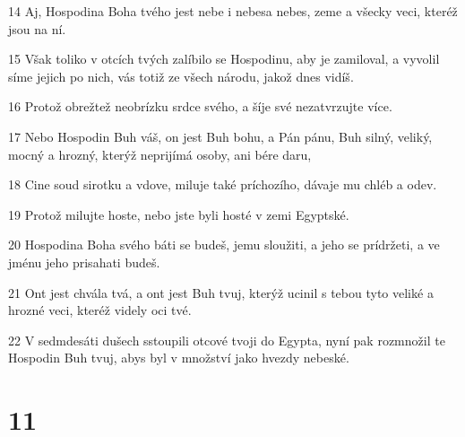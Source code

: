 \par 14 Aj, Hospodina Boha tvého jest nebe i nebesa nebes, zeme a všecky veci, kteréž jsou na ní.
\par 15 Však toliko v otcích tvých zalíbilo se Hospodinu, aby je zamiloval, a vyvolil síme jejich po nich, vás totiž ze všech národu, jakož dnes vidíš.
\par 16 Protož obrežtež neobrízku srdce svého, a šíje své nezatvrzujte více.
\par 17 Nebo Hospodin Buh váš, on jest Buh bohu, a Pán pánu, Buh silný, veliký, mocný a hrozný, kterýž neprijímá osoby, ani bére daru,
\par 18 Cine soud sirotku a vdove, miluje také príchozího, dávaje mu chléb a odev.
\par 19 Protož milujte hoste, nebo jste byli hosté v zemi Egyptské.
\par 20 Hospodina Boha svého báti se budeš, jemu sloužiti, a jeho se prídržeti, a ve jménu jeho prisahati budeš.
\par 21 Ont jest chvála tvá, a ont jest Buh tvuj, kterýž ucinil s tebou tyto veliké a hrozné veci, kteréž videly oci tvé.
\par 22 V sedmdesáti dušech sstoupili otcové tvoji do Egypta, nyní pak rozmnožil te Hospodin Buh tvuj, abys byl v množství jako hvezdy nebeské.

\chapter{11}

